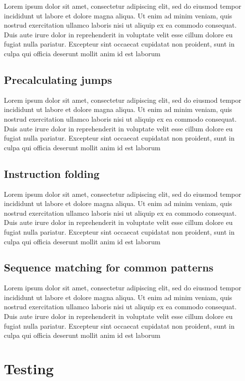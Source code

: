 \par Lorem ipsum dolor sit amet, consectetur adipiscing elit, sed do eiusmod tempor incididunt ut labore et dolore magna aliqua. Ut enim ad minim veniam, quis nostrud exercitation ullamco laboris nisi ut aliquip ex ea commodo consequat. Duis aute irure dolor in reprehenderit in voluptate velit esse cillum dolore eu fugiat nulla pariatur. Excepteur sint occaecat cupidatat non proident, sunt in culpa qui officia deserunt mollit anim id est laborum

\subsection{Precalculating jumps}
\label{subsec:ch2sec3sec1}

\par Lorem ipsum dolor sit amet, consectetur adipiscing elit, sed do eiusmod tempor incididunt ut labore et dolore magna aliqua. Ut enim ad minim veniam, quis nostrud exercitation ullamco laboris nisi ut aliquip ex ea commodo consequat. Duis aute irure dolor in reprehenderit in voluptate velit esse cillum dolore eu fugiat nulla pariatur. Excepteur sint occaecat cupidatat non proident, sunt in culpa qui officia deserunt mollit anim id est laborum

\subsection{Instruction folding}
\label{subsec:ch2sec3sec2}

\par Lorem ipsum dolor sit amet, consectetur adipiscing elit, sed do eiusmod tempor incididunt ut labore et dolore magna aliqua. Ut enim ad minim veniam, quis nostrud exercitation ullamco laboris nisi ut aliquip ex ea commodo consequat. Duis aute irure dolor in reprehenderit in voluptate velit esse cillum dolore eu fugiat nulla pariatur. Excepteur sint occaecat cupidatat non proident, sunt in culpa qui officia deserunt mollit anim id est laborum

\subsection{Sequence matching for common patterns}
\label{subsec:ch2sec3sec3}

\par Lorem ipsum dolor sit amet, consectetur adipiscing elit, sed do eiusmod tempor incididunt ut labore et dolore magna aliqua. Ut enim ad minim veniam, quis nostrud exercitation ullamco laboris nisi ut aliquip ex ea commodo consequat. Duis aute irure dolor in reprehenderit in voluptate velit esse cillum dolore eu fugiat nulla pariatur. Excepteur sint occaecat cupidatat non proident, sunt in culpa qui officia deserunt mollit anim id est laborum

\section{Testing}
\label{sec:ch2sec4}

\par 